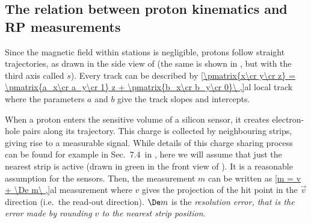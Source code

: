 \subsection[al psi]{The relation between proton kinematics and RP measurements}

Since the magnetic field within  stations is negligible, protons follow straight trajectories, as drawn in the side view of  (the same is shown in , but with the third axis called $s$). Every track can be described by
\eqref{\pmatrix{x\cr y\cr z} = \pmatrix{a_x\cr a_y\cr 1} z + \pmatrix{b_x\cr b_y\cr 0}\ ,}{al local track}
where the parameters $a$ and $b$ give the track slopes and intercepts.


When a proton enters the sensitive volume of a silicon sensor, it creates electron-hole pairs along its trajectory. This charge is collected by neighbouring strips, giving rise to a measurable signal. While details of this charge sharing process can be found for example in Sec.~7.4~in , here we will assume that just the nearest strip is active (drawn in green in the front view of ). It is a reasonable assumption for the  sensors. Then, the measurement $m$ can be written as
\eqref{m = v + \De m\ ,}{al measurement}
where $v$ gives the projection of the hit point in the $\vec v$ direction (i.e.~the read-out direction). $\De m$ is the \em{resolution error}, that is the error made by rounding $v$ to the nearest strip position.

